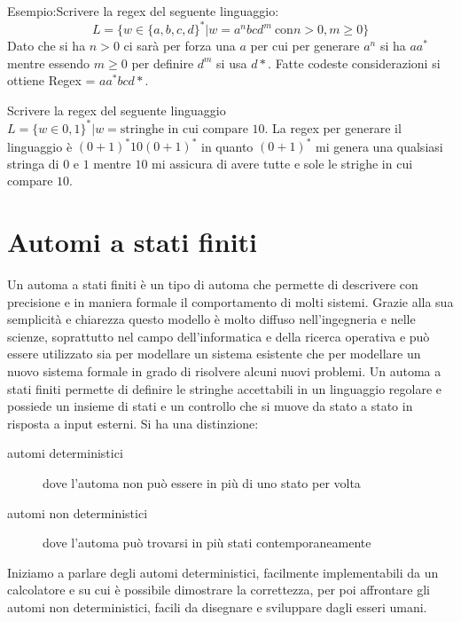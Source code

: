 \documentclass[a4paper]{book}
\theoremstyle{definition}%
\begin{document}
Esempio:Scrivere la regex del seguente linguaggio:
\[ L = \{ w \in \{a,b,c,d\}^* | w = a^n bcd^m \ \text{con} n > 0, m\geq 0\} \]
Dato che si ha $n > 0$ ci sarà per forza una $a$ per cui per generare $a^n$ si ha $aa^*$ mentre essendo $m \geq 0$ per
definire $d^m$ si usa $d*$.\newline
Fatte codeste considerazioni si ottiene Regex = $aa^*bcd*$.

Scrivere la regex del seguente linguaggio $L = \{ w \in {0,1\}^* | w = \text{stringhe in cui compare 10}}$.\newline
  La regex per generare il linguaggio è $(0+1)^*10(0+1)^*$ in quanto $(0+1)^*$ mi genera una qualsiasi stringa di $0$ e $1$ mentre
  $10$ mi assicura di avere tutte e sole le strighe in cui compare $10$.

\chapter{Automi a stati finiti}
Un automa a stati finiti è un tipo di automa che permette di descrivere con precisione e in maniera formale il comportamento di molti sistemi.\newline
Grazie alla sua semplicità e chiarezza questo modello è molto diffuso nell'ingegneria e nelle scienze, soprattutto nel campo dell'informatica
 e della ricerca operativa e può essere utilizzato sia per modellare un sistema esistente
  che per modellare un nuovo sistema formale in grado di risolvere alcuni nuovi problemi.
Un automa a stati finiti permette di definire le stringhe accettabili in un linguaggio regolare
e possiede un insieme di stati e un controllo che si muove da stato a stato in risposta a input esterni.\newline
 Si ha una distinzione:
\begin{description}
\item [automi deterministici] dove l'automa non può essere in più di uno stato per volta
\item [automi non deterministici] dove l'automa può trovarsi in più stati contemporaneamente
\end{description}
Iniziamo a parlare degli automi deterministici, facilmente implementabili da un calcolatore
e su cui è possibile dimostrare la correttezza, per poi affrontare gli automi non deterministici,
facili da disegnare e sviluppare dagli esseri umani.
\end{document}
